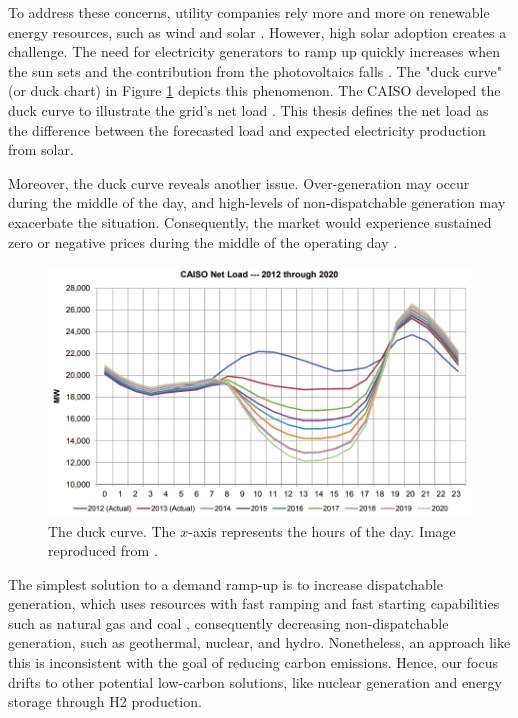 To address these concerns, utility companies rely more and more on renewable energy resources, such as wind and solar \cite{ming_resource_2019}.
However, high solar adoption creates a challenge.
The need for electricity generators to ramp up quickly increases when the sun sets and the contribution from the photovoltaics falls \cite{us_department_of_energy_confronting_2017}.
The "duck curve" (or duck chart) in Figure \ref{fig:duck} depicts this phenomenon.
The \gls{CAISO} developed the duck curve to illustrate the grid's net load \cite{bouillon_prepared_2014}.
This thesis defines the net load as the difference between the forecasted load and expected electricity production from solar.

Moreover, the duck curve reveals another issue.
Over-generation may occur during the middle of the day, and high-levels of non-dispatchable generation may exacerbate the situation.
Consequently, the market would experience sustained zero or negative prices during the middle of the operating day \cite{bouillon_prepared_2014}.

\begin{figure}[htbp!]
	\centering
	\includegraphics[width=0.75\linewidth]{figures-hydro/caiso-duck.png}
	\hfill
	\caption{The duck curve. The $x$-axis represents the hours of the day. Image reproduced from \cite{bouillon_prepared_2014}.}
	\label{fig:duck}
\end{figure}

The simplest solution to a demand ramp-up is to increase dispatchable generation, which uses resources with fast ramping and fast starting capabilities such as natural gas and coal \cite{bouillon_prepared_2014}, consequently decreasing non-dispatchable generation, such as geothermal, nuclear, and hydro.
Nonetheless, an approach like this is inconsistent with the goal of reducing carbon emissions.
Hence, our focus drifts to other potential low-carbon solutions, like nuclear generation and energy storage through \gls{H2} production.

